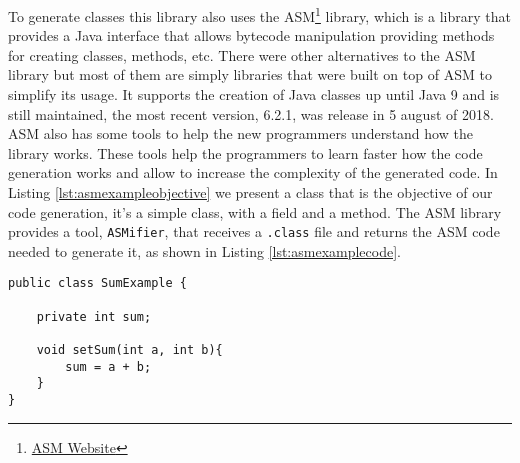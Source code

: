 \noindent
To generate classes this library also uses the ASM\footnote{\href{http://asm.ow2.org/}{ASM Website}} library, which is a library that provides a Java interface that allows bytecode manipulation providing methods for creating classes, methods, etc. There were other alternatives to the ASM library but most of them are simply libraries that were built on top of ASM to simplify its usage. It supports the creation of Java classes up until Java 9 and is still maintained, the most recent version, 6.2.1, was release in 5 august of 2018. ASM also has some tools to help the new programmers understand how the library works. These tools help the programmers to learn faster how the code generation works and allow to increase the complexity of the generated code. In Listing \ref{lst:asmexampleobjective} we present a class that is the objective of our code generation, it's a simple class, with a field and a method. The ASM library provides a tool, \texttt{ASMifier}, that receives a \texttt{.class} file and returns the ASM code needed to generate it, as shown in Listing \ref{lst:asmexamplecode}.

\bigskip


\begin{minipage}{\linewidth}
\begin{lstlisting}[caption={ASM Example - Objective},captionpos=b,label={lst:asmexampleobjective}]
public class SumExample {

    private int sum;

    void setSum(int a, int b){
        sum = a + b;
    }
}
\end{lstlisting}
\end{minipage}

\bigskip


